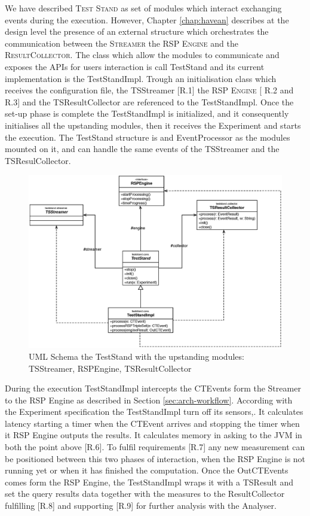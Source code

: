 We have described \name \textsc{Test Stand} as set of modules which interact exchanging events during the execution. However, Chapter \ref{chap:havean} describes at the design level the presence of an external structure which orchestrates the communication between the \textsc{Streamer} the \textsc{RSP Engine} and the \textsc{ResultCollector}. The class which allow the modules to communicate and exposes the APIs for users interaction is call TestStand and its current implementation is the TestStandImpl.
Trough an initialisation class which receives the configuration file, the TSStreamer [R.1] the \textsc{RSP Engine} [ R.2 and R.3] and the TSResultCollector are referenced to the TestStandImpl. Once the set-up phase is complete the TestStandImpl is initialized, and it consequently initialises all the upstanding modules, then it receives the Experiment and starts the execution. The TestStand structure is and EventProcessor as the modules mounted on it, and can handle the same events of the TSStreamer and the TSResulCollector.

\begin{figure}[tbh]
  \centering
	\includegraphics[width=0.90\linewidth]{images/uml_teststand_modules}
	\caption{UML Schema the TestStand with the upstanding modules: TSStreamer, RSPEngine, TSResultCollector} 
  	\label{fig:module-fsm}
\end{figure}

During the execution TestStandImpl intercepts the CTEvents form the Streamer to the RSP Engine as described in Section \ref{sec:arch-workflow}. According with the Experiment specification the TestStandImpl turn off its sensors,. It calculates latency starting a timer when the CTEvent arrives and stopping the timer when it RSP Engine outputs the results. It calculates memory in asking to the JVM in both the point above [R.6]. To fulfil requirements [R.7] any new measurement can be positioned between this two phases of interaction, when the RSP Engine is not running yet or when it has finished the computation. Once the OutCTEvents comes form the RSP Engine, the TestStandImpl wraps it with a TSResult and set the query results data together with the measures to the ResultCollector fulfilling [R.8] and supporting [R.9] for further analysis with the Analyser.
%

